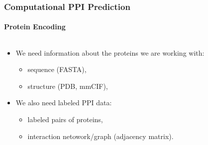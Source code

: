 \begin{frame}[fragile]
  \frametitle{Computational PPI Prediction}
  \framesubtitle{Protein Encoding}

  \begin{columns}
    \begin{column}{\textwidth}
      \vspace{-2em}

      \begin{itemize}
        \item<1-> We need information about the proteins we are working with:
              \begin{itemize}
                \item sequence (FASTA),
                \item structure (PDB, mmCIF),
                
              \end{itemize}
        \item<2-> We also need labeled PPI data:
              \begin{itemize}
                \item labeled pairs of proteins,
                \item interaction netowork/graph (adjacency matrix).
              \end{itemize}
      \end{itemize}
    \end{column}
  \end{columns}

\end{frame}
